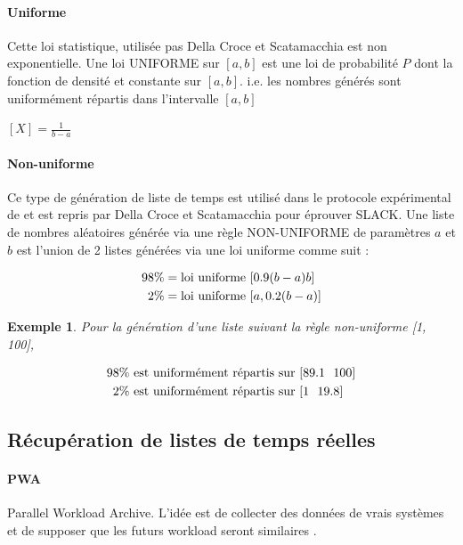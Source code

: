 \documentclass[a4paper,12pt]{report}
\theoremstyle{plain}				%
\newtheorem{example}{Exemple}
\theoremstyle{definition}				%
\newcommand\dcs{Della Croce et Scatamacchia\xspace}
\newcommand{\lp}[1]{\todo[author=LP,color=yellow,inline]{#1}}
\begin{document}
\paragraph{Uniforme} Cette loi statistique, utilisée pas \dcs est non exponentielle. 
Une loi UNIFORME sur $[a, b]$ est une loi de probabilité $P$ dont la fonction de densité et 
  constante sur $[a, b]$. i.e. les nombres générés sont uniformément répartis dans l'intervalle $[a, b]$

\begin{center}
$[X] = \frac{1}{b-a}$
\end{center}

\paragraph{Non-uniforme} Ce type de génération de liste de temps est utilisé dans le protocole expérimental de \cite{frangioni2004multi} et est repris par \dcs \cite{della2020longest} pour éprouver SLACK.
Une liste de nombres aléatoires générée via une règle NON-UNIFORME de paramètres $a$ et $b$ 
  est l'union de 2 listes générées via une loi uniforme comme suit :

\begin{align*}
	98 \%  &= \textnormal{loi uniforme } [0.9(b-a) b] \\
	2\%    &= \textnormal{loi uniforme } [a, 0.2(b-a)] 
\end{align*}

\begin{example}
Pour la génération d'une liste suivant la règle non-uniforme [1, 100], 

\begin{align*}
	98 \%  &\textnormal{ est uniformément répartis sur } [89.1~~ 100] \\
	2\%    &\textnormal{ est uniformément répartis sur } [1   ~~ 19.8] 
\end{align*}

\end{example}
\lp{}
 
\subsection{Récupération de listes de temps réelles}\label{ssec:instancesGenerationListesTempsReelles}

\paragraph{PWA} Parallel Workload Archive. L'idée est de collecter des données de vrais systèmes et de 
  supposer que les futurs workload seront similaires \cite{feitelson2014experience}.
\end{document}
